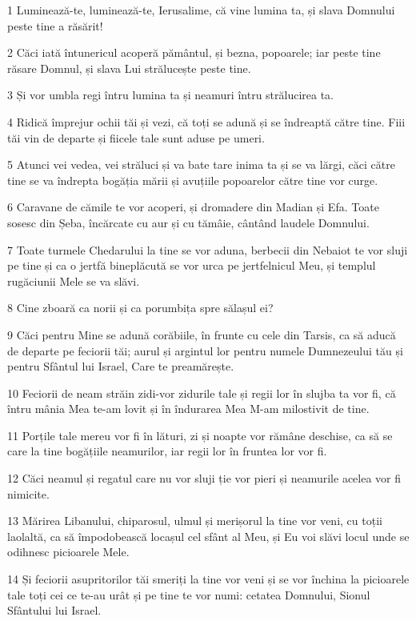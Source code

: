 \par 1 Luminează-te, luminează-te, Ierusalime, că vine lumina ta, și slava Domnului peste tine a răsărit!
\par 2 Căci iată întunericul acoperă pământul, și bezna, popoarele; iar peste tine răsare Domnul, și slava Lui strălucește peste tine.
\par 3 Și vor umbla regi întru lumina ta și neamuri întru strălucirea ta.
\par 4 Ridică împrejur ochii tăi și vezi, că toți se adună și se îndreaptă către tine. Fiii tăi vin de departe și fiicele tale sunt aduse pe umeri.
\par 5 Atunci vei vedea, vei străluci și va bate tare inima ta și se va lărgi, căci către tine se va îndrepta bogăția mării și avuțiile popoarelor către tine vor curge.
\par 6 Caravane de cămile te vor acoperi, și dromadere din Madian și Efa. Toate sosesc din Șeba, încărcate cu aur și cu tămâie, cântând laudele Domnului.
\par 7 Toate turmele Chedarului la tine se vor aduna, berbecii din Nebaiot te vor sluji pe tine și ca o jertfă bineplăcută se vor urca pe jertfelnicul Meu, și templul rugăciunii Mele se va slăvi.
\par 8 Cine zboară ca norii și ca porumbița spre sălașul ei?
\par 9 Căci pentru Mine se adună corăbiile, în frunte cu cele din Tarsis, ca să aducă de departe pe feciorii tăi; aurul și argintul lor pentru numele Dumnezeului tău și pentru Sfântul lui Israel, Care te preamărește.
\par 10 Feciorii de neam străin zidi-vor zidurile tale și regii lor în slujba ta vor fi, că întru mânia Mea te-am lovit și în îndurarea Mea M-am milostivit de tine.
\par 11 Porțile tale mereu vor fi în lături, zi și noapte vor rămâne deschise, ca să se care la tine bogățiile neamurilor, iar regii lor în fruntea lor vor fi.
\par 12 Căci neamul și regatul care nu vor sluji ție vor pieri și neamurile acelea vor fi nimicite.
\par 13 Mărirea Libanului, chiparosul, ulmul și merișorul la tine vor veni, cu toții laolaltă, ca să împodobească locașul cel sfânt al Meu, și Eu voi slăvi locul unde se odihnesc picioarele Mele.
\par 14 Și feciorii asupritorilor tăi smeriți la tine vor veni și se vor închina la picioarele tale toți cei ce te-au urât și pe tine te vor numi: cetatea Domnului, Sionul Sfântului lui Israel.
